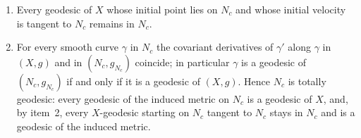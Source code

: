 \begin{lemma}
\begin{enumerate}
along $N_c$. Moreover every smooth map from a smooth manifold into $X$
with image contained in $N_c$ is smooth as a map into $N_c$.
\item Every geodesic of $X$ whose initial point lies on $N_c$ and whose
initial velocity is tangent to $N_c$ remains in $N_c$.
\item For every smooth curve $\gamma$ in $N_c$ the covariant derivatives
of $\gamma'$ along $\gamma$ in $(X,g)$ and in $(N_c,g_{N_c})$ coincide;
in particular $\gamma$ is a geodesic of $(N_c,g_{N_c})$ if and only if
it is a geodesic of $(X,g)$. Hence $N_c$ is totally geodesic: every
geodesic of the induced metric on $N_c$ is a geodesic of $X$, and, by
item~2, every $X$-geodesic starting on $N_c$ tangent to $N_c$ stays in
$N_c$ and is a geodesic of the induced metric.
\end{enumerate}
\end{lemma}

